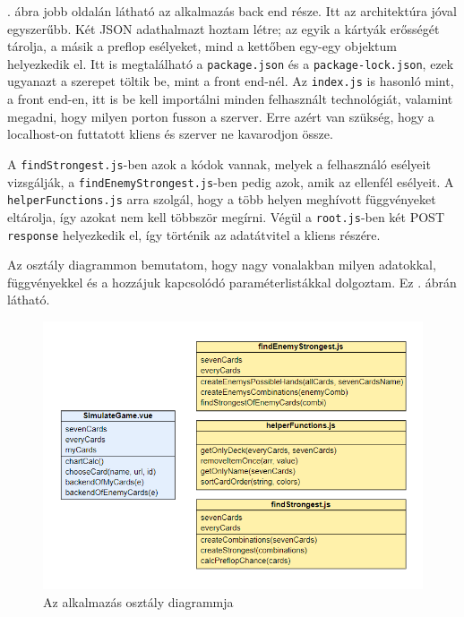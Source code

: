 . ábra jobb oldalán látható az alkalmazás back end része. Itt az architektúra jóval egyszerűbb. Két JSON adathalmazt hoztam létre; az egyik a kártyák erősségét tárolja, a másik a preflop esélyeket, mind a kettőben egy-egy objektum helyezkedik el. Itt is megtalálható a \texttt{package.json} és a \texttt{package-lock.json}, ezek ugyanazt a szerepet töltik be, mint a front end-nél. Az \texttt{index.js} is hasonló mint, a front end-en, itt is be kell importálni minden felhasznált technológiát, valamint megadni, hogy milyen porton fusson a szerver. Erre azért van szükség, hogy a localhost-on futtatott kliens és szerver ne kavarodjon össze.

A \texttt{findStrongest.js}-ben azok a kódok vannak, melyek a felhasználó esélyeit vizsgálják, a \texttt{findEnemyStrongest.js}-ben pedig azok, amik az ellenfél esélyeit. A \\ \texttt{helperFunctions.js} arra szolgál, hogy a több helyen meghívott függvényeket eltárolja, így azokat nem kell többször megírni. Végül a \texttt{root.js}-ben két POST \texttt{response} helyezkedik el, így történik az adatátvitel a kliens részére.

Az osztály diagrammon bemutatom, hogy nagy vonalakban milyen adatokkal, függvényekkel és a hozzájuk kapcsolódó paraméterlistákkal dolgoztam. Ez . ábrán látható.

\begin{figure}[h]
	\centering
	\includegraphics[scale=1]{images/class-model.png}
	\caption{Az alkalmazás osztály diagrammja}
	\label{fig:class-model}
\end{figure}

